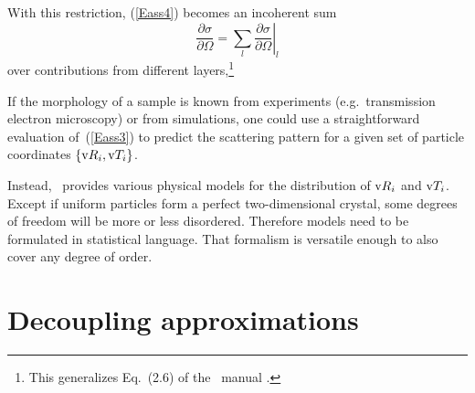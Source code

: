 With this restriction, (\ref{Eass4}) becomes an incoherent sum
\begin{equation}
  \frac{\partial\sigma}{\partial\Omega}
  = \sum_{l} \left.\frac{\partial\sigma}{\partial\Omega}\right|_l
\end{equation}
over contributions from different layers,\footnote
{This generalizes Eq.~(2.6) of the \IsGISAXS\ manual \cite{Laz08}.}

If the morphology of a sample is known from experiments
(e.g.\ transmission electron microscopy) or from simulations,
one could use a straightforward evaluation of~(\ref{Eass3})
to predict the scattering pattern
for a given set of particle coordinates $\{\text{v}{R}_i,\text{v}{T}_i\}$.

\addtocounter{footnote}{1}

Instead, \BornAgain\ provides various physical models
for the distribution of $\text{v}{R}_i$ and $\text{v}{T}_i$.
Except if uniform particles form a perfect two-dimensional crystal,
some degrees of freedom will be more or less disordered.
Therefore models need to be formulated in statistical language.
That formalism is versatile enough to also cover any degree of order.

\section{Decoupling approximations}\label{Spartidis}

